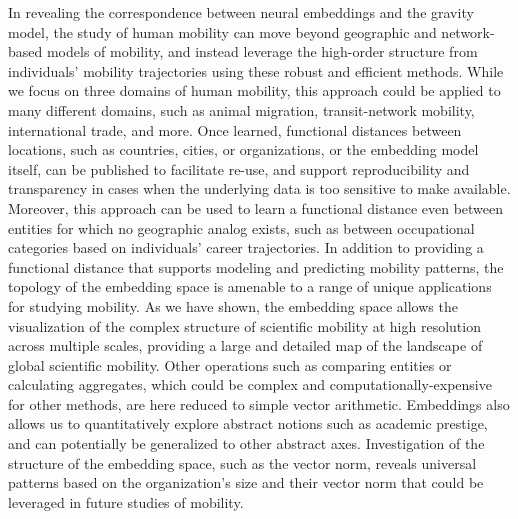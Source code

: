 \documentclass[12pt]{article} %
\begin{document}
In revealing the correspondence between neural embeddings and the gravity model, the study of human mobility can move beyond geographic and network-based models of mobility, and instead leverage the high-order structure from individuals' mobility trajectories using these robust and efficient methods.
While we focus on three domains of human mobility, this approach could be applied to many different domains, such as animal migration, transit-network mobility, international trade, and more.
Once learned, functional distances between locations, such as countries, cities, or organizations, or the embedding model itself, can be published to facilitate re-use, and support reproducibility and transparency in cases when the underlying data is too sensitive to make available.
Moreover, this approach can be used to learn a functional distance even between entities for which no geographic analog exists, such as between occupational categories based on individuals' career trajectories.
In addition to providing a functional distance that supports modeling and predicting mobility patterns, the topology of the embedding space is amenable to a range of unique applications for studying mobility.
As we have shown, the embedding space allows the visualization of the complex structure of scientific mobility at high resolution across multiple scales, providing a large and detailed map of the landscape of global scientific mobility.
Other operations such as comparing entities or calculating aggregates, which could be complex and computationally-expensive for other methods, are here reduced to simple vector arithmetic.
Embeddings also allows us to quantitatively explore abstract notions such as academic prestige, and can potentially be generalized to other abstract axes.
Investigation of the structure of the embedding space, such as the vector norm, reveals universal patterns based on the organization's size and their vector norm that could be leveraged in future studies of mobility.
\end{document}
